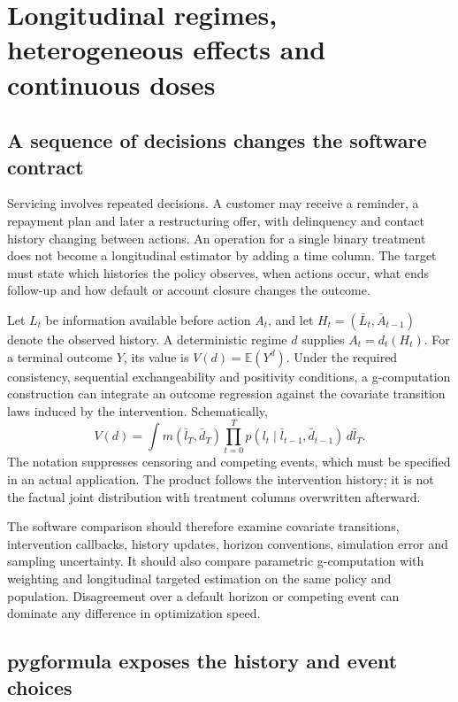 \chapter{Longitudinal regimes, heterogeneous effects and continuous doses}
\label{v13:sw-regimes}

\section{A sequence of decisions changes the software contract}

Servicing involves repeated decisions. A customer may receive a reminder, a
repayment plan and later a restructuring offer, with delinquency and contact
history changing between actions. An operation for a single binary treatment
does not become a longitudinal estimator by adding a time column. The target
must state which histories the policy observes, when actions occur, what ends
follow-up and how default or account closure changes the outcome.

Let $L_t$ be information available before action $A_t$, and let
$H_t=(\bar L_t,\bar A_{t-1})$ denote the observed history. A deterministic regime
$d$ supplies $A_t=d_t(H_t)$. For a terminal outcome $Y$, its value is
$V(d)=\mathbb E(Y^d)$. Under the required consistency, sequential
exchangeability and positivity conditions, a g-computation construction can
integrate an outcome regression against the covariate transition laws induced
by the intervention. Schematically,
\[
 V(d)=\int m(\bar l_T,\bar d_T)
             \prod_{t=0}^{T}p(l_t\mid\bar l_{t-1},\bar d_{t-1})
             \,d\bar l_T.
\]
The notation suppresses censoring and competing events, which must be specified
in an actual application. The product follows the intervention history; it is
not the factual joint distribution with treatment columns overwritten afterward.

The software comparison should therefore examine covariate transitions,
intervention callbacks, history updates, horizon conventions, simulation error
and sampling uncertainty. It should also compare parametric g-computation with
weighting and longitudinal targeted estimation on the same policy and population.
Disagreement over a default horizon or competing event can dominate any
difference in optimization speed.

\section{pygformula exposes the history and event choices}

